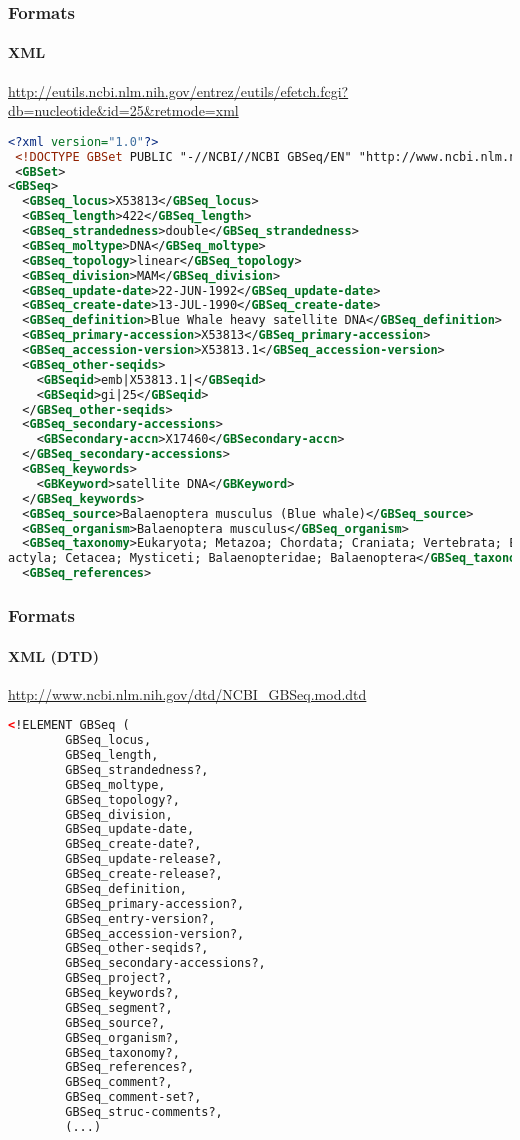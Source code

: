 \documentclass{beamer}
\begin{document}
\begin{frame}[fragile]
\frametitle{Formats}
\framesubtitle{XML}
\url{http://eutils.ncbi.nlm.nih.gov/entrez/eutils/efetch.fcgi?db=nucleotide&id=25&retmode=xml}
\begin{lstlisting}[language=xml,basicstyle=\tiny,breaklines=false]
<?xml version="1.0"?>
 <!DOCTYPE GBSet PUBLIC "-//NCBI//NCBI GBSeq/EN" "http://www.ncbi.nlm.nih.gov/dtd/NCBI_GBSeq.dtd">
 <GBSet>
<GBSeq>
  <GBSeq_locus>X53813</GBSeq_locus>
  <GBSeq_length>422</GBSeq_length>
  <GBSeq_strandedness>double</GBSeq_strandedness>
  <GBSeq_moltype>DNA</GBSeq_moltype>
  <GBSeq_topology>linear</GBSeq_topology>
  <GBSeq_division>MAM</GBSeq_division>
  <GBSeq_update-date>22-JUN-1992</GBSeq_update-date>
  <GBSeq_create-date>13-JUL-1990</GBSeq_create-date>
  <GBSeq_definition>Blue Whale heavy satellite DNA</GBSeq_definition>
  <GBSeq_primary-accession>X53813</GBSeq_primary-accession>
  <GBSeq_accession-version>X53813.1</GBSeq_accession-version>
  <GBSeq_other-seqids>
    <GBSeqid>emb|X53813.1|</GBSeqid>
    <GBSeqid>gi|25</GBSeqid>
  </GBSeq_other-seqids>
  <GBSeq_secondary-accessions>
    <GBSecondary-accn>X17460</GBSecondary-accn>
  </GBSeq_secondary-accessions>
  <GBSeq_keywords>
    <GBKeyword>satellite DNA</GBKeyword>
  </GBSeq_keywords>
  <GBSeq_source>Balaenoptera musculus (Blue whale)</GBSeq_source>
  <GBSeq_organism>Balaenoptera musculus</GBSeq_organism>
  <GBSeq_taxonomy>Eukaryota; Metazoa; Chordata; Craniata; Vertebrata; Euteleostomi; Mammalia; Eutheria; Laurasiatheria; Cetartiod
actyla; Cetacea; Mysticeti; Balaenopteridae; Balaenoptera</GBSeq_taxonomy>
  <GBSeq_references>
\end{lstlisting}
\end{frame}


\begin{frame}[fragile]
\frametitle{Formats}
\framesubtitle{XML (DTD)}
\url{http://www.ncbi.nlm.nih.gov/dtd/NCBI_GBSeq.mod.dtd}
\begin{lstlisting}[language=xml,basicstyle=\tiny,breaklines=false]
<!ELEMENT GBSeq (
        GBSeq_locus, 
        GBSeq_length, 
        GBSeq_strandedness?, 
        GBSeq_moltype, 
        GBSeq_topology?, 
        GBSeq_division, 
        GBSeq_update-date, 
        GBSeq_create-date?, 
        GBSeq_update-release?, 
        GBSeq_create-release?, 
        GBSeq_definition, 
        GBSeq_primary-accession?, 
        GBSeq_entry-version?, 
        GBSeq_accession-version?, 
        GBSeq_other-seqids?, 
        GBSeq_secondary-accessions?, 
        GBSeq_project?, 
        GBSeq_keywords?, 
        GBSeq_segment?, 
        GBSeq_source?, 
        GBSeq_organism?, 
        GBSeq_taxonomy?, 
        GBSeq_references?, 
        GBSeq_comment?, 
        GBSeq_comment-set?, 
        GBSeq_struc-comments?, 
        (...)
\end{lstlisting}
\end{frame}
\end{document}
